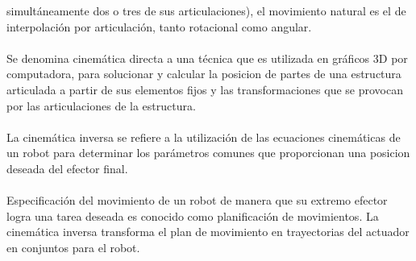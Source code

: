 \documentclass[12pt,a4paper]{article}
\begin{document}
simultáneamente dos o tres de sus articulaciones), el movimiento natural es el de interpolación por articulación, tanto rotacional como angular.
\\\\
Se denomina cinemática directa a una técnica que es utilizada en gráficos 3D por computadora, para solucionar y calcular la posicion de partes de una estructura articulada a partir de sus elementos fijos y las transformaciones que se provocan por las articulaciones de la estructura.
\\\\
La cinemática inversa se refiere a la utilización de las ecuaciones cinemáticas de un robot
para determinar los parámetros comunes que proporcionan una posicion deseada del efector
final. 
\\\\
Especificación del movimiento de un robot de manera que su extremo efector logra una
tarea deseada es conocido como planificación de movimientos. La cinemática inversa transforma el plan de movimiento en trayectorias del actuador en conjuntos para el robot.\\\\
\end{document}
